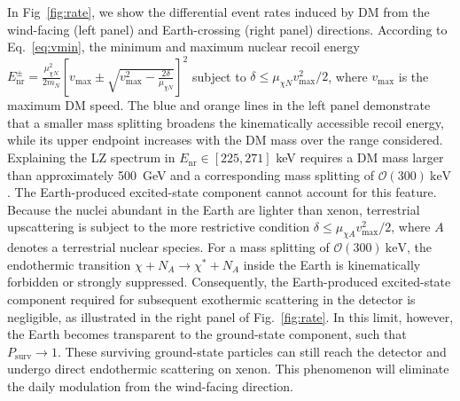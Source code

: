 \documentclass[aps,twocolumn,prl,showpacs,showkeys,preprintnumbers,superscriptaddress,nobibnotes,floatfix,nofootinbib]{revtex4-2}
\begin{document}
In Fig~\ref{fig:rate}, we show the differential event rates induced by DM from the wind-facing (left panel) and Earth-crossing (right panel) directions. According to Eq.~\ref{eq:vmin}, the minimum and maximum nuclear recoil energy $E_{\mathrm{nr}}^{\pm} = \frac{\mu_{\chi N}^{2}}{2m_N}\left[v_{\max}\pm\sqrt{v_{\max}^{2}-\frac{2\delta}{\mu_{\chi N}}}\right]^2$ subject to $\delta\leq\mu_{\chi N}v_{\max}^{2}/2$, where $v_{\max}$ is the maximum DM speed. The blue and orange lines in the left panel demonstrate that a smaller mass splitting broadens the kinematically accessible recoil energy, while its upper endpoint increases with the DM mass over the range considered. Explaining the LZ spectrum in $E_{\mathrm{nr}} \in[225,271]$ keV requires a DM mass larger than approximately 500~GeV and a corresponding mass splitting of $\mathcal{O}(300)~\mathrm{keV}$. The Earth-produced excited-state component cannot account for this
feature. Because the nuclei abundant in the Earth are lighter than xenon, terrestrial upscattering is subject to the more restrictive condition $\delta\leq\mu_{\chi A}v_{\max}^{2}/2$, where $A$ denotes a terrestrial nuclear species. For a mass splitting of $\mathcal{O}(300)~\mathrm{keV}$, the endothermic transition $\chi+N_A\to\chi^\ast+N_A$ inside the Earth is kinematically forbidden or strongly suppressed. Consequently, the Earth-produced excited-state component required for subsequent exothermic scattering in the detector is negligible, as illustrated in the right panel of Fig.~\ref{fig:rate}. In this limit, however, the Earth becomes transparent to the ground-state component, such that $P_{\mathrm{surv}}\to1$. These surviving ground-state particles can still reach the detector and undergo direct endothermic scattering on xenon. This phenomenon will eliminate the daily modulation from the wind-facing direction. 
\end{document}
